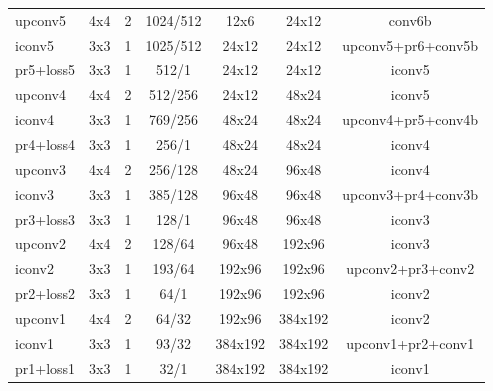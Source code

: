 \begin{table}[htbp]
\begin{small}
\begin{tabular}{|l|c c c|c c|c|}
			upconv5    & 4x4 & 2 & 1024/512  & 12x6        & 24x12    & conv6b \\
			iconv5        & 3x3 & 1 & 1025/512  & 24x12      & 24x12    & upconv5+pr6+conv5b \\
			pr5+loss5  & 3x3 & 1 & 512/1         & 24x12      & 24x12    & iconv5 \\
			upconv4    & 4x4 & 2 & 512/256   & 24x12      & 48x24    & iconv5 \\
			iconv4        & 3x3 & 1 & 769/256  & 48x24     & 48x24    & upconv4+pr5+conv4b \\
			pr4+loss4 & 3x3 & 1  & 256/1       & 48x24     & 48x24    & iconv4 \\
			upconv3    & 4x4 & 2 & 256/128  & 48x24     & 96x48    & iconv4 \\
			iconv3        & 3x3 & 1 & 385/128  & 96x48    & 96x48    & upconv3+pr4+conv3b \\
			pr3+loss3 & 3x3 & 1 & 128/1        & 96x48    & 96x48    & iconv3 \\
			upconv2    & 4x4 & 2 & 128/64    & 96x48    & 192x96   & iconv3 \\
			iconv2        & 3x3 & 1 & 193/64   & 192x96   & 192x96   & upconv2+pr3+conv2 \\
			pr2+loss2  & 3x3 & 1 & 64/1        & 192x96   & 192x96    & iconv2 \\
			upconv1     & 4x4 & 2 & 64/32    & 192x96    & 384x192 & iconv2 \\
			iconv1        & 3x3 & 1 & 93/32     &384x192  & 384x192 & upconv1+pr2+conv1 \\
			pr1+loss1  & 3x3 & 1 & 32/1         & 384x192 & 384x192 & iconv1 \\\hline
		\end{tabular}
    \end{small}
\end{table}

